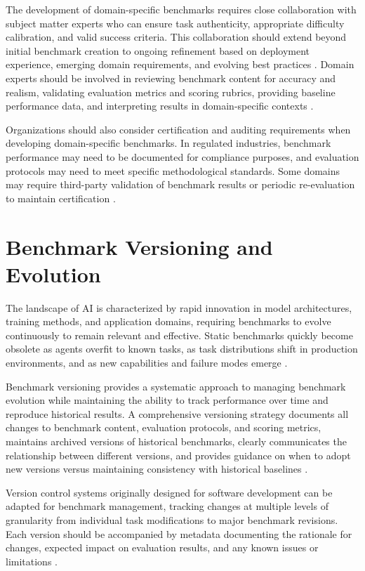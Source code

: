\begin{TNtwocol}
The development of domain-specific benchmarks requires close collaboration with subject matter experts who can ensure task authenticity, appropriate difficulty calibration, and valid success criteria. This collaboration should extend beyond initial benchmark creation to ongoing refinement based on deployment experience, emerging domain requirements, and evolving best practices \cite{nori2023,thirunavukarasu2023,kiela2021}. Domain experts should be involved in reviewing benchmark content for accuracy and realism, validating evaluation metrics and scoring rubrics, providing baseline performance data, and interpreting results in domain-specific contexts \cite{nori2023,thirunavukarasu2023,jin2021}.

Organizations should also consider certification and auditing requirements when developing domain-specific benchmarks. In regulated industries, benchmark performance may need to be documented for compliance purposes, and evaluation protocols may need to meet specific methodological standards. Some domains may require third-party validation of benchmark results or periodic re-evaluation to maintain certification \cite{liu2023,jin2021}.

\section{Benchmark Versioning and Evolution}
The landscape of AI is characterized by rapid innovation in model architectures, training methods, and application domains, requiring benchmarks to evolve continuously to remain relevant and effective. Static benchmarks quickly become obsolete as agents overfit to known tasks, as task distributions shift in production environments, and as new capabilities and failure modes emerge \cite{kiela2021,liu2023,recht2019}.

Benchmark versioning provides a systematic approach to managing benchmark evolution while maintaining the ability to track performance over time and reproduce historical results. A comprehensive versioning strategy documents all changes to benchmark content, evaluation protocols, and scoring metrics, maintains archived versions of historical benchmarks, clearly communicates the relationship between different versions, and provides guidance on when to adopt new versions versus maintaining consistency with historical baselines \cite{kiela2021,reimers2017,dror2018}.

Version control systems originally designed for software development can be adapted for benchmark management, tracking changes at multiple levels of granularity from individual task modifications to major benchmark revisions. Each version should be accompanied by metadata documenting the rationale for changes, expected impact on evaluation results, and any known issues or limitations \cite{kiela2021,liu2023}.


\end{TNtwocol}

